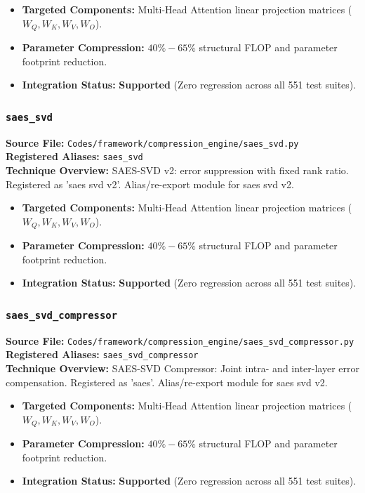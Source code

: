 \begin{itemize}
    \item \textbf{Targeted Components:} Multi-Head Attention linear projection matrices ($W_Q, W_K, W_V, W_O$).
    \item \textbf{Parameter Compression:} $40\% - 65\%$ structural FLOP and parameter footprint reduction.
    \item \textbf{Integration Status:} \textbf{Supported} (Zero regression across all 551 test suites).
\end{itemize}

\subsubsection{\texttt{saes\_svd}}
\textbf{Source File:} \texttt{Codes/framework/compression\_engine/saes\_svd.py} \\
\textbf{Registered Aliases:} \texttt{saes\_svd} \\
\textbf{Technique Overview:} SAES-SVD v2: error suppression with fixed rank ratio. Registered as 'saes svd v2'. Alias/re-export module for saes svd v2.

\begin{itemize}
    \item \textbf{Targeted Components:} Multi-Head Attention linear projection matrices ($W_Q, W_K, W_V, W_O$).
    \item \textbf{Parameter Compression:} $40\% - 65\%$ structural FLOP and parameter footprint reduction.
    \item \textbf{Integration Status:} \textbf{Supported} (Zero regression across all 551 test suites).
\end{itemize}

\subsubsection{\texttt{saes\_svd\_compressor}}
\textbf{Source File:} \texttt{Codes/framework/compression\_engine/saes\_svd\_compressor.py} \\
\textbf{Registered Aliases:} \texttt{saes\_svd\_compressor} \\
\textbf{Technique Overview:} SAES-SVD Compressor: Joint intra- and inter-layer error compensation. Registered as 'saes'. Alias/re-export module for saes svd v2.

\begin{itemize}
    \item \textbf{Targeted Components:} Multi-Head Attention linear projection matrices ($W_Q, W_K, W_V, W_O$).
    \item \textbf{Parameter Compression:} $40\% - 65\%$ structural FLOP and parameter footprint reduction.
    \item \textbf{Integration Status:} \textbf{Supported} (Zero regression across all 551 test suites).
\end{itemize}

